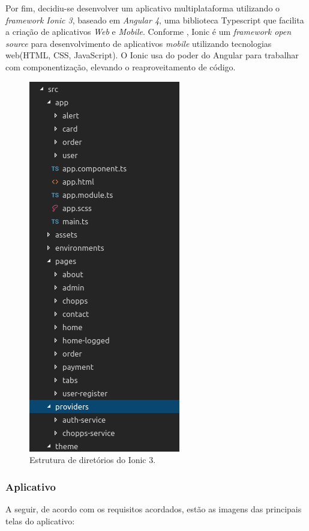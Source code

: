 Por fim, decidiu-se desenvolver um aplicativo multiplataforma utilizando o \textit{framework Ionic 3}, baseado em \textit{Angular 4}, uma biblioteca Typescript que facilita a criação de aplicativos \textit{Web} e \textit{Mobile}. Conforme \cite{ionic}, Ionic é um \textit{framework open source} para desenvolvimento de aplicativos \textit{mobile} utilizando tecnologias web(HTML, CSS, JavaScript). O Ionic usa do poder do Angular para trabalhar com componentização, elevando o reaproveitamento de código.

\begin{figure}[!hb]
    \centering
    \includegraphics{figuras/ionicstructure.png}
    \caption{Estrutura de diretórios do Ionic 3.}
    \label{home-page}
\end{figure}

\subsubsection{Aplicativo}

A seguir, de acordo com os requisitos acordados, estão as imagens das principais telas do aplicativo:

